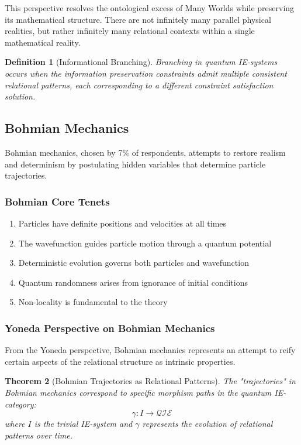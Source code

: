 \documentclass[12pt,a4paper]{article}
\newtheorem{theorem}{Theorem}[section]
\newtheorem{definition}[theorem]{Definition}
\begin{document}
This perspective resolves the ontological excess of Many Worlds while preserving its mathematical structure. There are not infinitely many parallel physical realities, but rather infinitely many relational contexts within a single mathematical reality.

\begin{definition}[Informational Branching]
Branching in quantum IE-systems occurs when the information preservation constraints admit multiple consistent relational patterns, each corresponding to a different constraint satisfaction solution.
\end{definition}

\subsection{Bohmian Mechanics}

Bohmian mechanics, chosen by 7\% of respondents, attempts to restore realism and determinism by postulating hidden variables that determine particle trajectories.

\subsubsection{Bohmian Core Tenets}
\begin{enumerate}
\item Particles have definite positions and velocities at all times
\item The wavefunction guides particle motion through a quantum potential
\item Deterministic evolution governs both particles and wavefunction
\item Quantum randomness arises from ignorance of initial conditions
\item Non-locality is fundamental to the theory
\end{enumerate}

\subsubsection{Yoneda Perspective on Bohmian Mechanics}

From the Yoneda perspective, Bohmian mechanics represents an attempt to reify certain aspects of the relational structure as intrinsic properties.

\begin{theorem}[Bohmian Trajectories as Relational Patterns]
The "trajectories" in Bohmian mechanics correspond to specific morphism paths in the quantum IE-category:
\[
\gamma: I \to \mathcal{QIE}
\]
where $I$ is the trivial IE-system and $\gamma$ represents the evolution of relational patterns over time.
\end{theorem}
\end{document}

